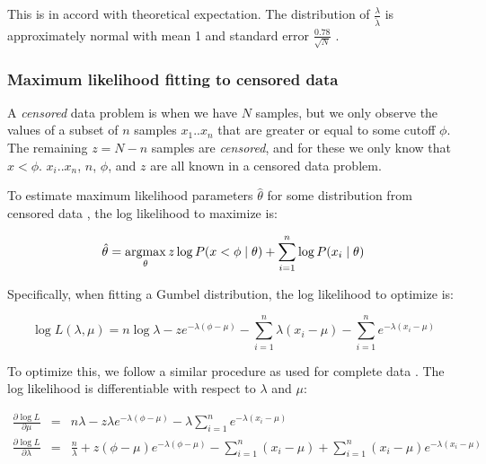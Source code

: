 This is in accord with theoretical expectation. The distribution of
$\frac{\lambda}{\hat{\lambda}}$ is approximately normal with mean 1 and
standard error $\frac{0.78}{\sqrt{N}}$ \citep{Lawless82,Altschul01}. 



\subsubsection{Maximum likelihood fitting to censored data}

A \emph{censored} data problem is when we have $N$ samples, but we
only observe the values of a subset of $n$ samples $x_1..x_n$ that are
greater or equal to some cutoff $\phi$. The remaining $z = N-n$
samples are \emph{censored}, and for these we only know that $x <
\phi$.  $x_i..x_n$, $n$, $\phi$, and $z$ are all known in a censored
data problem.

To estimate maximum likelihood parameters $\hat{\theta}$ for some
distribution from censored data \citep{Gelman95}, the log likelihood
to maximize is:


\[ 
  \hat{\theta} = \argmax_{\theta} z \log P(x<\phi \mid \theta)
                         + \sum_{i=1}^n \log P(x_i \mid \theta)
\]

Specifically, when fitting a Gumbel distribution, the log likelihood
to optimize is:

\begin{equation}
  \log L(\lambda, \mu) = 
    n \log \lambda 
     - z e^{-\lambda(\phi - \mu)}
     - \sum_{i=1}^{n} \lambda(x_i - \mu) 
     - \sum_{i=1}^{n} e^{-\lambda(x_i - \mu)}
\label{eqn:censor_logL}
\end{equation}

To optimize this, we follow a similar procedure as used for complete
data \citep{Lawless82}. The log likelihood is differentiable with
respect to $\lambda$ and $\mu$:

\begin{eqnarray}
\frac{\partial \log L}{\partial \mu} & = &
n \lambda  
- z \lambda e^{-\lambda (\phi - \mu)}
- \lambda \sum_{i=1}^{n} e^{-\lambda (x_i - \mu)}
\label{eqn:censor_dmu}
\\%
\frac{\partial \log L}{\partial \lambda} & = &
\frac{n}{\lambda} 
+ z (\phi - \mu) e^{-\lambda (\phi - \mu)}
- \sum_{i=1}^{n} (x_i - \mu) 
+ \sum_{i=1}^{n} (x_i - \mu) e^{-\lambda (x_i - \mu)}
\label{eqn:censor_dlambda}
\end{eqnarray}

